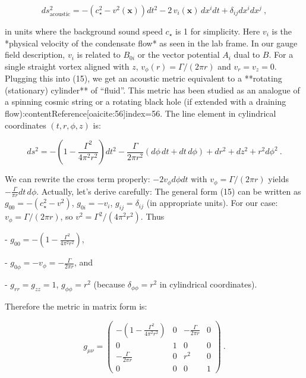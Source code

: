 \documentclass[12pt]{article}
\begin{document}
\[ ds^2_{\text{acoustic}} = -\left(c_\star^2 - v^2(\mathbf{x})\right)dt^2 - 2\, v_i(\mathbf{x})\, dx^i dt + \delta_{ij} dx^i dx^j~, \tag{15} \] 

in units where the background sound speed $c_\star$ is 1 for simplicity. Here $v_i$ is the *physical velocity of the condensate flow* as seen in the lab frame. In our gauge field description, $v_i$ is related to $B_{0i}$ or the vector potential $A_i$ dual to $B$. For a single straight vortex aligned with $z$, $v_\phi(r) = \Gamma/(2\pi r)$ and $v_r = v_z = 0$. Plugging this into (15), we get an acoustic metric equivalent to a **rotating (stationary) cylinder** of “fluid”. This metric has been studied as an analogue of a spinning cosmic string or a rotating black hole (if extended with a draining flow):contentReference[oaicite:56]{index=56}. The line element in cylindrical coordinates $(t,r,\phi,z)$ is:

\[ ds^2 = -\left(1 - \frac{\Gamma^2}{4\pi^2 r^2}\right)dt^2 - \frac{\Gamma}{2\pi r^2}(d\phi\, dt + dt\, d\phi) + dr^2 + dz^2 + r^2 d\phi^2~. \tag{16}\]

We can rewrite the cross term properly: $-2v_\phi d\phi dt$ with $v_\phi = \Gamma/(2\pi r)$ yields $-\frac{\Gamma}{\pi r} dt\, d\phi$. Actually, let’s derive carefully: The general form (15) can be written as $g_{00} = -(c_\star^2 - v^2)$, $g_{0i} = -v_i$, $g_{ij} = \delta_{ij}$ (in appropriate units). For our case: $v_\phi = \Gamma/(2\pi r)$, so $v^2 = \Gamma^2/(4\pi^2 r^2)$. Thus 

- $g_{00} = -\left(1 - \frac{\Gamma^2}{4\pi^2 r^2}\right)$, 

- $g_{0\phi} = - v_\phi = -\frac{\Gamma}{2\pi r}$, and 

- $g_{rr}=g_{zz}=1$, $g_{\phi\phi} = r^2$ (because $\delta_{\phi\phi} = r^2$ in cylindrical coordinates).

Therefore the metric in matrix form is:

\[ g_{\mu\nu} = \begin{pmatrix} -(1 - \frac{\Gamma^2}{4\pi^2 r^2}) & 0 & -\frac{\Gamma}{2\pi r} & 0 \\ 0 & 1 & 0 & 0 \\ -\frac{\Gamma}{2\pi r} & 0 & r^2 & 0 \\ 0 & 0 & 0 & 1 \end{pmatrix}~. \tag{17}\]
\end{document}
